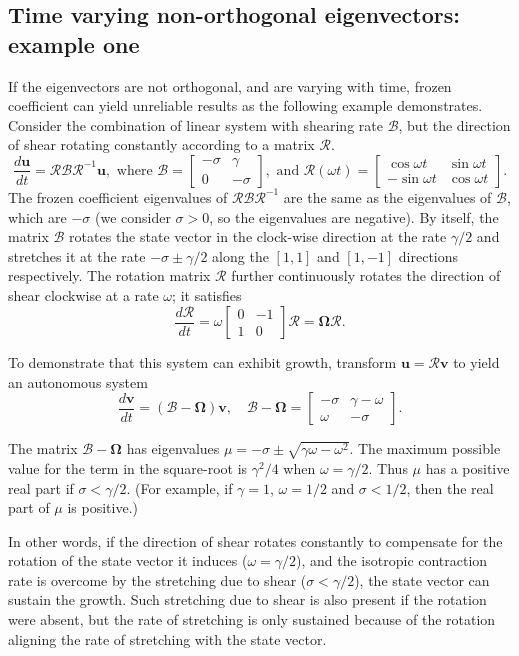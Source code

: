 \documentclass[letterpaper,10pt]{article}
\newcommand{\bu}{\boldsymbol{u}}
\newcommand{\bv}{\boldsymbol{v}}
\newcommand{\cB}{\boldsymbol{\mathcal{B}}}
\newcommand{\cR}{\boldsymbol{\mathcal{R}}}
\newcommand{\cOmega}{\boldsymbol{\boldsymbol{\Omega}}}
\newcommand{\Rot}{{
\begin{bmatrix} 
  \cos \omega t & \sin \omega t \\
 -\sin \omega t & \cos \omega t
\end{bmatrix}
}}
\newcommand{\Bmat}{{
\begin{bmatrix} 
 -\sigma & \gamma \\
 0  & -\sigma
\end{bmatrix}
}}
\begin{document}
\subsection*{Time varying non-orthogonal eigenvectors: example one}
If the eigenvectors are not orthogonal, and are varying with time, frozen coefficient can yield unreliable results as the following example demonstrates. Consider the combination of linear system with shearing rate $\cB$, but the direction of shear rotating constantly according to a matrix $\cR$.
\begin{equation}
 \frac{d\bu}{dt} = \cR \cB \cR^{-1} \bu, \text{ where } \cB = \Bmat, \text{ and } \cR(\omega t) = \Rot.
\end{equation}
The frozen coefficient eigenvalues of $\cR \cB \cR^{-1}$ are the same as the eigenvalues of $\cB$, which are $-\sigma$ (we consider $\sigma>0$, so the eigenvalues are negative). 
By itself, the matrix $\cB$ rotates the state vector in the clock-wise direction at the rate $\gamma/2$ and stretches it at the rate $-\sigma \pm \gamma/2$ along the $[1, 1]$ and $[1, -1]$ directions respectively. 
The rotation matrix $\cR$ further continuously rotates the direction of shear clockwise at a rate $\omega$; it satisfies
\begin{equation}
 \frac{d\cR}{dt} = \omega \begin{bmatrix} 0 & -1 \\ 1 & 0 \end{bmatrix} \cR = \cOmega \cR.
\end{equation}

To demonstrate that this system can exhibit growth, transform $\bu = \cR \bv$ to yield an autonomous system
\begin{equation}
 \frac{d\bv}{dt} = (\cB - \cOmega) \bv, \quad \cB - \cOmega = \begin{bmatrix} -\sigma & \gamma-\omega \\ \omega & -\sigma \end{bmatrix}.
\end{equation} 
          
The matrix $\cB - \cOmega$ has eigenvalues $\mu = -\sigma \pm \sqrt{\gamma \omega -\omega^2}$. The maximum possible value for the term in the square-root is $\gamma^2/4$ when $\omega = \gamma/2$. Thus $\mu$ has a positive real part if $\sigma < \gamma/2$. (For example, if $\gamma = 1$, $\omega = 1/2$ and $\sigma < 1/2$, then the real part of $\mu$ is positive.)  

In other words, if the direction of shear rotates constantly to compensate for the rotation of the state vector it induces ($\omega = \gamma/2$), and the isotropic contraction rate is overcome by the stretching due to shear ($\sigma<\gamma/2$), the state vector can sustain the growth. Such stretching due to shear is also present if the rotation were absent, but the rate of stretching is only sustained because of the rotation aligning the rate of stretching with the state vector. 
\end{document}
